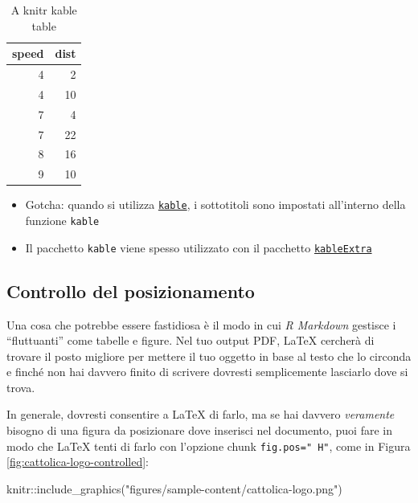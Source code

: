 \documentclass[a4paper, 11pt, nobind]{templates/ociamthesis}
\providecommand{\tightlist}{%
  \setlength{\itemsep}{0pt}\setlength{\parskip}{0pt}}
\newenvironment{Shaded}{\begin{snugshade}}{\end{snugshade}}
\newcommand{\FunctionTok}[1]{\textcolor[rgb]{0.00,0.00,0.00}{#1}}
\newcommand{\NormalTok}[1]{#1}
\newcommand{\SpecialCharTok}[1]{\textcolor[rgb]{0.00,0.00,0.00}{#1}}
\newcommand{\StringTok}[1]{\textcolor[rgb]{0.31,0.60,0.02}{#1}}
\renewenvironment{Shaded}
{
  \vspace{10pt}%
  \begin{snugshade}%
}{%
  \end{snugshade}%
  \vspace{8pt}%
}
\begin{document}
\begin{table}

\caption{\label{tab:cars-table}A knitr kable table}
\centering
\begin{tabular}[t]{r|r}
\hline
speed & dist\\
\hline
4 & 2\\
\hline
4 & 10\\
\hline
7 & 4\\
\hline
7 & 22\\
\hline
8 & 16\\
\hline
9 & 10\\
\hline
\end{tabular}
\end{table}

\begin{itemize}
\tightlist
\item
  Gotcha: quando si utilizza \href{https://www.rdocumentation.org/packages/knitr/versions/1.21/topics/kable}{\texttt{kable}}, i sottotitoli sono impostati all'interno della funzione \texttt{kable}
\item
  Il pacchetto \texttt{kable} viene spesso utilizzato con il pacchetto \href{https://cran.r-project.org/web/packages/kableExtra/vignettes/awesome_table_in_html.html}{\texttt{kableExtra}}
\end{itemize}

\hypertarget{controllo-del-posizionamento}{%
\subsection{Controllo del posizionamento}\label{controllo-del-posizionamento}}

Una cosa che potrebbe essere fastidiosa è il modo in cui \emph{R Markdown} gestisce i ``fluttuanti'' come tabelle e figure.
Nel tuo output PDF, LaTeX cercherà di trovare il posto migliore per mettere il tuo oggetto in base al testo che lo circonda e finché non hai davvero finito di scrivere dovresti semplicemente lasciarlo dove si trova.

In generale, dovresti consentire a LaTeX di farlo, ma se hai davvero \emph{veramente} bisogno di una figura da posizionare dove inserisci nel documento, puoi fare in modo che LaTeX tenti di farlo con l'opzione chunk \texttt{fig.pos="\ H"}, come in Figura \ref{fig:cattolica-logo-controlled}:

\begin{Shaded}
\begin{Highlighting}[]
\NormalTok{knitr}\SpecialCharTok{::}\FunctionTok{include\_graphics}\NormalTok{(}\StringTok{"figures/sample{-}content/cattolica{-}logo.png"}\NormalTok{)}
\end{Highlighting}
\end{Shaded}
\end{document}
